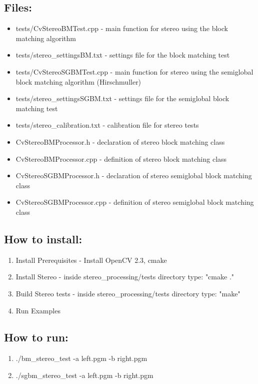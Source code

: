 
\subsection{Files:}

\begin{itemize}
\item{tests/CvStereoBMTest.cpp - main function for stereo using the block matching algorithm}
\item{tests/stereo\_settingsBM.txt - settings file for the block matching test}
\item{tests/CvStereoSGBMTest.cpp - main function for stereo using the semiglobal block matching algorithm (Hirschmuller)}
\item{tests/stereo\_settingsSGBM.txt - settings file for the semiglobal block matching test}
\item{tests/stereo\_calibration.txt - calibration file for stereo tests}
\item{CvStereoBMProcessor.h - declaration of stereo block matching class}
\item{CvStereoBMProcessor.cpp - definition of stereo block matching class}
\item{CvStereoSGBMProcessor.h - declaration of stereo semiglobal block matching class}
\item{CvStereoSGBMProcessor.cpp - definition of stereo semiglobal block matching class}
\end{itemize}


\subsection{How to install:}
\begin{enumerate}
	\item{Install Prerequisites - Install OpenCV 2.3, cmake} 
	\item{Install Stereo - inside stereo\_processing/tests directory type: "cmake ." } 
	\item{Build Stereo tests - inside stereo\_processing/tests directory type: "make" }  
	\item{Run Examples} 
\end{enumerate}

\subsection{How to run:}
\begin{enumerate}
   \item{./bm\_stereo\_test -a left.pgm -b right.pgm}
   \item{./sgbm\_stereo\_test -a left.pgm -b right.pgm}
\end{enumerate}

